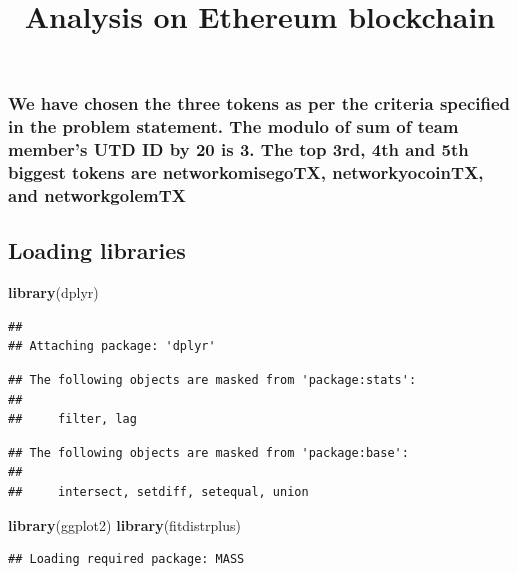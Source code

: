 \documentclass[]{article}
\title{Analysis on Ethereum blockchain}
\author{}
\date{}
\newenvironment{Shaded}{\begin{snugshade}}{\end{snugshade}}
\newcommand{\KeywordTok}[1]{\textcolor[rgb]{0.13,0.29,0.53}{\textbf{#1}}}
\newcommand{\NormalTok}[1]{#1}
\begin{document}
\maketitle

\subsubsection{We have chosen the three tokens as per the criteria
specified in the problem statement. The modulo of sum of team member's
UTD ID by 20 is 3. The top 3rd, 4th and 5th biggest tokens are
networkomisegoTX, networkyocoinTX, and
networkgolemTX}\label{we-have-chosen-the-three-tokens-as-per-the-criteria-specified-in-the-problem-statement.-the-modulo-of-sum-of-team-members-utd-id-by-20-is-3.-the-top-3rd-4th-and-5th-biggest-tokens-are-networkomisegotx-networkyocointx-and-networkgolemtx}

\subsection{Loading libraries}\label{loading-libraries}

\begin{Shaded}
\begin{Highlighting}[]
\KeywordTok{library}\NormalTok{(dplyr)}
\end{Highlighting}
\end{Shaded}

\begin{verbatim}
## 
## Attaching package: 'dplyr'
\end{verbatim}

\begin{verbatim}
## The following objects are masked from 'package:stats':
## 
##     filter, lag
\end{verbatim}

\begin{verbatim}
## The following objects are masked from 'package:base':
## 
##     intersect, setdiff, setequal, union
\end{verbatim}

\begin{Shaded}
\begin{Highlighting}[]
\KeywordTok{library}\NormalTok{(ggplot2)}
\KeywordTok{library}\NormalTok{(fitdistrplus)}
\end{Highlighting}
\end{Shaded}

\begin{verbatim}
## Loading required package: MASS
\end{verbatim}
\end{document}
